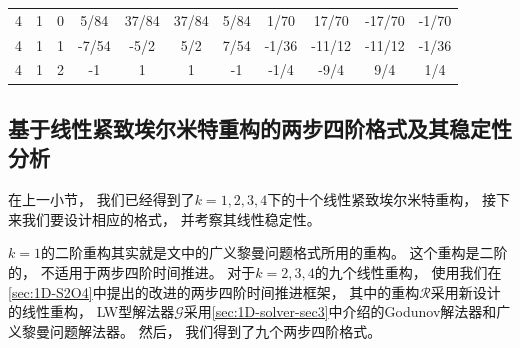 \begin{table}[htbp]
\begin{tabular}{ccc cccc cccc}
    4   & 1   & 0   & 5/84               & 37/84              & 37/84              & 5/84               & 1/70               & 17/70              & -17/70             & -1/70              \\
    4   & 1   & 1   & -7/54              & -5/2               & 5/2                & 7/54               & -1/36              & -11/12             & -11/12             & -1/36              \\
    4   & 1   & 2   & -1                 & 1                  & 1                  & -1                 & -1/4               & -9/4               & 9/4                & 1/4                \\
    \bottomrule
  \end{tabular}
\end{table}

\subsection{基于线性紧致埃尔米特重构的两步四阶格式及其稳定性分析}

在上一小节，
我们已经得到了$k=1,2,3,4$下的十个线性紧致埃尔米特重构，
接下来我们要设计相应的格式，
并考察其线性稳定性。

$k=1$的二阶重构其实就是文\cite{Book-Matania}中的广义黎曼问题格式所用的重构。
这个重构是二阶的，
不适用于两步四阶时间推进。
对于$k=2,3,4$的九个线性重构，
使用我们在\cref{sec:1D-S2O4}中提出的改进的两步四阶时间推进框架，
其中的重构$\mathcal{R}$采用新设计的线性重构，
LW型解法器$\mathcal{G}$采用\cref{sec:1D-solver-sec3}中介绍的Godunov解法器和广义黎曼问题解法器。
然后，
我们得到了九个两步四阶格式。

